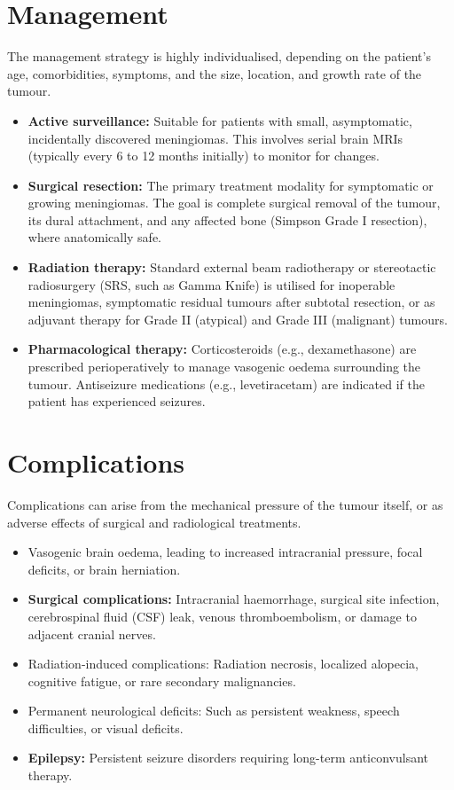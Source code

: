 \section*{Management}
The management strategy is highly individualised, depending on the patient's age, comorbidities, symptoms, and the size, location, and growth rate of the tumour.
\begin{itemize}
    \item \textbf{Active surveillance:} Suitable for patients with small, asymptomatic, incidentally discovered meningiomas. This involves serial brain MRIs (typically every 6 to 12 months initially) to monitor for changes.
    \item \textbf{Surgical resection:} The primary treatment modality for symptomatic or growing meningiomas. The goal is complete surgical removal of the tumour, its dural attachment, and any affected bone (Simpson Grade I resection), where anatomically safe.
    \item \textbf{Radiation therapy:} Standard external beam radiotherapy or stereotactic radiosurgery (SRS, such as Gamma Knife) is utilised for inoperable meningiomas, symptomatic residual tumours after subtotal resection, or as adjuvant therapy for Grade II (atypical) and Grade III (malignant) tumours.
    \item \textbf{Pharmacological therapy:} Corticosteroids (e.g., dexamethasone) are prescribed perioperatively to manage vasogenic oedema surrounding the tumour. Antiseizure medications (e.g., levetiracetam) are indicated if the patient has experienced seizures.
\end{itemize}

\section*{Complications}
Complications can arise from the mechanical pressure of the tumour itself, or as adverse effects of surgical and radiological treatments.
\begin{itemize}
    \item Vasogenic brain oedema, leading to increased intracranial pressure, focal deficits, or brain herniation.
    \item \textbf{Surgical complications:} Intracranial haemorrhage, surgical site infection, cerebrospinal fluid (CSF) leak, venous thromboembolism, or damage to adjacent cranial nerves.
    \item Radiation-induced complications: Radiation necrosis, localized alopecia, cognitive fatigue, or rare secondary malignancies.
    \item Permanent neurological deficits: Such as persistent weakness, speech difficulties, or visual deficits.
    \item \textbf{Epilepsy:} Persistent seizure disorders requiring long-term anticonvulsant therapy.
\end{itemize}

